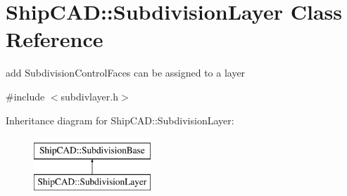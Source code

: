 \hypertarget{classShipCAD_1_1SubdivisionLayer}{\section{Ship\-C\-A\-D\-:\-:Subdivision\-Layer Class Reference}
\label{classShipCAD_1_1SubdivisionLayer}
}


add Subdivision\-Control\-Faces can be assigned to a layer  




{\ttfamily \#include $<$subdivlayer.\-h$>$}

Inheritance diagram for Ship\-C\-A\-D\-:\-:Subdivision\-Layer\-:\begin{figure}[H]
\begin{center}
\leavevmode
\includegraphics[height=2.000000cm]{classShipCAD_1_1SubdivisionLayer}
\end{center}
\end{figure}
